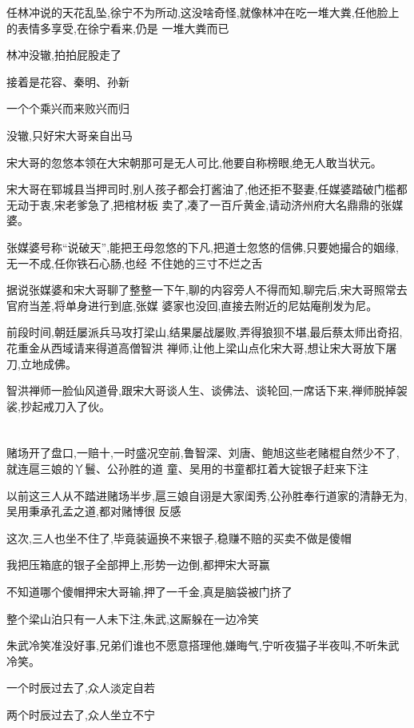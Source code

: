 ﻿\documentclass[12pt]{article}
\begin{document}
任林冲说的天花乱坠,徐宁不为所动,这没啥奇怪,就像林冲在吃一堆大粪,任他脸上的表情多享受,在徐宁看来,仍是
一堆大粪而已

林冲没辙,拍拍屁股走了

接着是花容、秦明、孙新\dldots

一个个乘兴而来败兴而归\dldots

没辙,只好宋大哥亲自出马

宋大哥的忽悠本领在大宋朝那可是无人可比,他要自称榜眼,绝无人敢当状元。

宋大哥在郓城县当押司时,别人孩子都会打酱油了,他还拒不娶妻,任媒婆踏破门槛都无动于衷,宋老爹急了,把棺材板
卖了,凑了一百斤黄金,请动济州府大名鼎鼎的张媒婆。

张媒婆号称``说破天'',能把王母忽悠的下凡,把道士忽悠的信佛,只要她撮合的姻缘,无一不成,任你铁石心肠,也经
不住她的三寸不烂之舌

据说张媒婆和宋大哥聊了整整一下午,聊的内容旁人不得而知,聊完后,宋大哥照常去官府当差,将单身进行到底,张媒
婆家也没回,直接去附近的尼姑庵削发为尼。

前段时间,朝廷屡派兵马攻打梁山,结果屡战屡败,弄得狼狈不堪,最后蔡太师出奇招,花重金从西域请来得道高僧智洪
禅师,让他上梁山点化宋大哥,想让宋大哥放下屠刀,立地成佛。

智洪禅师一脸仙风道骨,跟宋大哥谈人生、谈佛法、谈轮回,一席话下来,禅师脱掉袈裟,抄起戒刀入了伙。

\section{}

赌场开了盘口,一赔十,一时盛况空前,鲁智深、刘唐、鲍旭这些老赌棍自然少不了,就连扈三娘的丫鬟、公孙胜的道
童、吴用的书童都扛着大锭银子赶来下注\dldots

以前这三人从不踏进赌场半步,扈三娘自诩是大家闺秀,公孙胜奉行道家的清静无为,吴用秉承孔孟之道,都对赌博很
反感\dldots

这次,三人也坐不住了,毕竟装逼换不来银子,稳赚不赔的买卖不做是傻帽

我把压箱底的银子全部押上,形势一边倒,都押宋大哥赢

不知道哪个傻帽押宋大哥输,押了一千金,真是脑袋被门挤了

整个梁山泊只有一人未下注,朱武,这厮躲在一边冷笑\dldots

朱武冷笑准没好事,兄弟们谁也不愿意搭理他,嫌晦气,宁听夜猫子半夜叫,不听朱武冷笑。

一个时辰过去了,众人淡定自若\dldots

两个时辰过去了,众人坐立不宁\dldots
\end{document}
